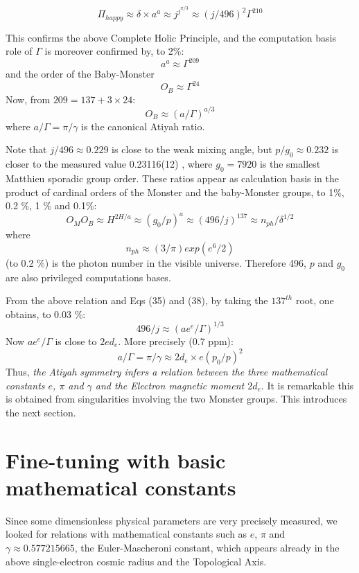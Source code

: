 \documentclass[twoside,draft]{article}
\begin{document}
\begin{sloppypar}
{$$\Pi_{happy} \approx \delta \times a^{a} \approx j^{j^{\pi/3}} \approx (j/496)^2 \Gamma^{210}$$

This confirms the above Complete Holic Principle, and the computation basis role of $\Gamma$ is moreover confirmed by, to 2\%: $$a^a \approx \Gamma^{209}$$ and the order of the Baby-Monster $$O_B\approx\Gamma^{24}$$ Now, from $209 = 137 + 3\times 24$:
\begin{equation}
O_B \approx (a/\Gamma)^{a/3}
\end{equation}
where $a/\Gamma = \pi/\gamma $ is the canonical Atiyah ratio.

Note that $j/496 \approx 0.229$ is close to the weak mixing angle, but $p/g_0 \approx 0.232$ is closer to the measured value 0.23116(12) \cite{Tanabashi}, where $g_0 = 7920 $ is the smallest Matthieu sporadic group order. These ratios appear as calculation basis in the product of cardinal orders of the Monster and the baby-Monster groups, to 1\%, 0.2 \%, 1 \% and 0.1\%:
$$O_MO_B\approx H^{2H/a} \approx (g_0/p)^a \approx (496/j)^{137} \approx  n_{ph}/\delta^{1/2} $$
where $$n_{ph}\approx (3/\pi) exp(e^6/2)$$ (to 0.2 \%) is the photon number in the visible universe. Therefore 496, $p$ and $g_0$ are also privileged computations bases. 

From the above relation and Eqs (35) and (38), by taking the $137^{th}$ root, one obtains, to 0.03 \%: $$496/j \approx (ae^e/\Gamma)^{1/3}$$
Now $ae^e/\Gamma$ is close to $2ed_e$. More precisely (0.7 ppm):
\begin{equation}
a/\Gamma = \pi/\gamma \approx 2d_e \times e (p_0/p)^2 
\end{equation}
Thus, \textit{the Atiyah symmetry infers a relation between the three mathematical constants $e$, $\pi$ and $\gamma$ and the Electron magnetic moment $2d_e$}. It is remarkable this is obtained from singularities involving the two Monster groups. This introduces the next section.

\section{Fine-tuning with basic mathematical constants}

Since some dimensionless physical parameters are very precisely measured, we looked for
relations with mathematical constants such as $e$, $\pi$ and $\gamma \approx
0.577215665$, the Euler-Mascheroni constant, which appears already in the above single-electron
cosmic radius and the Topological Axis.

}
\end{sloppypar}
\end{document}
